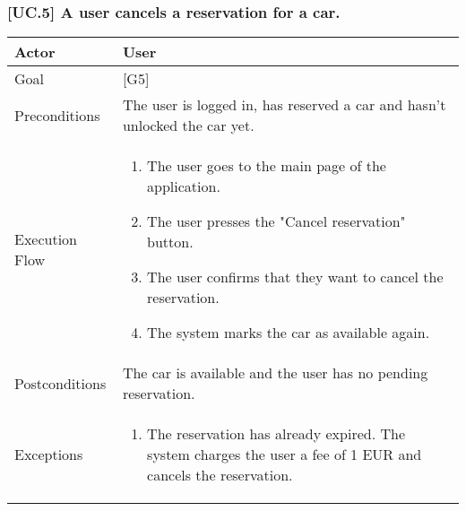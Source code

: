 \documentclass[english]{article}
\begin{document}
	\subsubsection{[UC.5] A user cancels a reservation for a car.}
	\begin{tabularx}{\textwidth}{  l  X  }
		\hline
		Actor & User\\
		\hline
		Goal & [G5]\\
		\hline
		Preconditions & The user is logged in, has reserved a car and hasn't unlocked the car yet.\\
		\hline
		Execution Flow & \begin{enumerate}
			\item{The user goes to the main page of the application.}
			\item{The user presses the "Cancel reservation" button.}
			\item{The user confirms that they want to cancel the reservation.}
			\item{The system marks the car as available again.}
		\end{enumerate}\\
		\hline
		Postconditions & The car is available and the user has no pending reservation. \\
		\hline
		Exceptions & \begin{enumerate}
			\item{The reservation has already expired. The system charges the user a fee of 1 EUR and cancels the reservation.}
		\end{enumerate}\\
		\hline
	\end{tabularx}
\end{document}
